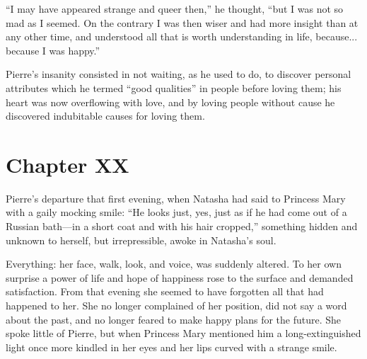 ``I may have appeared strange and queer then,'' he thought, ``but
I was not so mad as I seemed. On the contrary I was then wiser
and had more insight than at any other time, and understood all
that is worth understanding in life, because... because I was
happy.''

Pierre's insanity consisted in not waiting, as he used to do, to
discover personal attributes which he termed ``good qualities''
in people before loving them; his heart was now overflowing with
love, and by loving people without cause he discovered
indubitable causes for loving them.


\chapter*{Chapter XX}
\ifaudio 
{}
\fi

 Pierre's departure that first evening, when Natasha had
said to Princess Mary with a gaily mocking smile: ``He looks
just, yes, just as if he had come out of a Russian bath---in a
short coat and with his hair cropped,'' something hidden and
unknown to herself, but irrepressible, awoke in Natasha's soul.

Everything: her face, walk, look, and voice, was suddenly
altered. To her own surprise a power of life and hope of
happiness rose to the surface and demanded satisfaction. From
that evening she seemed to have forgotten all that had happened
to her. She no longer complained of her position, did not say a
word about the past, and no longer feared to make happy plans for
the future. She spoke little of Pierre, but when Princess Mary
mentioned him a long-extinguished light once more kindled in her
eyes and her lips curved with a strange smile.

